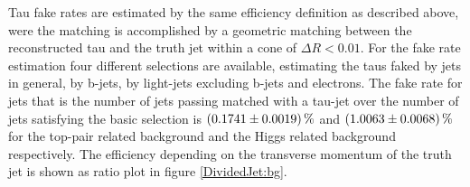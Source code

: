 %
Tau fake rates are estimated by the same efficiency definition as described above, were the matching is accomplished by a geometric matching between the reconstructed tau and the truth jet within a cone of $\Delta R<0.01$. For the fake rate estimation four different selections are available, estimating the taus faked by jets in general, by b-jets, by light-jets excluding b-jets and electrons. The fake rate for jets that is the number of jets passing matched with a tau-jet over the number of jets satisfying the basic selection is $\SI{0.1741\pm 0.0019}{\percent}$ and $\SI{1.0063\pm 0.0068}{\percent}$ for the top-pair related background and the Higgs related background respectively.\newline
The efficiency depending on the transverse momentum of the truth jet is shown as ratio plot in figure \ref{DividedJet:bg}.
%
